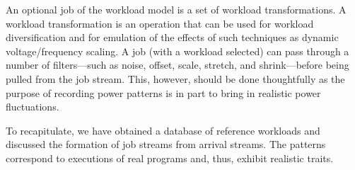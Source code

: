 An optional job of the workload model is a set of workload transformations. A
workload transformation is an operation that can be used for workload
diversification and for emulation of the effects of such techniques as dynamic
voltage/frequency scaling. A job (with a workload selected) can pass through a
number of filters---such as noise, offset, scale, stretch, and shrink---before
being pulled from the job stream. This, however, should be done thoughtfully as
the purpose of recording power patterns is in part to bring in realistic power
fluctuations.

To recapitulate, we have obtained a database of reference workloads and
discussed the formation of job streams from arrival streams. The patterns
correspond to executions of real programs and, thus, exhibit realistic traits.
